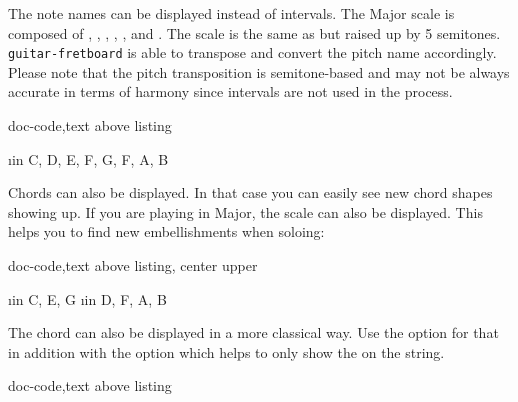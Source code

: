 \documentclass[a4paper]{article}
\newcommand{\pkg}[1]{\texttt{#1}}
\begin{document}
The note names can be displayed instead of intervals. The \pF Major scale is
composed of \pF, \pG, \pA, \pBb, \pC, \pD and \pE. The \pF scale is the same
as \pC but raised up by 5 semitones. \pkg{guitar-fretboard} is able to
transpose and convert the pitch name accordingly. Please note that the pitch
transposition is semitone-based and may not be always accurate in terms of
harmony since intervals are not used in the process.

\begin{tcblisting}{doc-code,text above listing}
  \begin{fretboard}[frets before = 2, frets after = 2,
      transpose = 5,
      transpose pitch,
      title = {\pF Major scale\\\Large (\pF, \pG, \pA, \pBb, \pC, \pD, \pE)},
      scale=0.35,
      fret numbers]
    \foreach \i in { C, D, E, F, G, F, A, B} {
      \note[split]{\i}
    }
  \end{fretboard}
\end{tcblisting}



Chords can also be displayed. In that case you can easily see new \pC chord
shapes showing up. If you are playing in \pC Major, the scale can also be
displayed. This helps you to find new embellishments when soloing:

\begin{tcblisting}{doc-code,text above listing, center upper}
  \begin{fretboard}[frets before = 2, frets after = 2,
      title = {\pC Chord (and \pC major scale)},
      scale = 0.35,
      fret numbers]
    \foreach \i in {C, E, G} {
      \note{\i}
    }
    \foreach \i in {D, F, A, B} {
      \note[shade]{\i}
    }
  \end{fretboard}
\end{tcblisting}

The \pC chord can also be displayed in a more classical way. Use the
 option for that in addition with the  option which
helps to only show the \pG on the  string.

\begin{tcblisting}{doc-code,text above listing}
  \begin{fretboard}[frets min = 0, frets max = 3, fret numbers,
      title = {\pC}, chord, scale=0.35]
      
  \end{fretboard}
\end{tcblisting}
\end{document}
